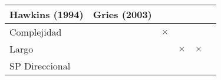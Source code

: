 \documentclass[12pt,spanish,a4paper,]{article}
\begin{document}
\begin{longtable}[]{@{}lccccc@{}}
\begin{minipage}[b]{0.13\columnwidth}
Hawkins (1994)\strut
\end{minipage} & \begin{minipage}[b]{0.13\columnwidth}\centering
Gries (2003)\strut
\end{minipage}\tabularnewline
\midrule
\endhead
\begin{minipage}[t]{0.18\columnwidth}\raggedright
Complejidad\strut
\end{minipage} & \begin{minipage}[t]{0.15\columnwidth}\centering
\strut
\end{minipage} & \begin{minipage}[t]{0.13\columnwidth}\centering
\(\times\)\strut
\end{minipage} & \begin{minipage}[t]{0.13\columnwidth}\centering
\strut
\end{minipage} & \begin{minipage}[t]{0.13\columnwidth}\centering
\strut
\end{minipage} & \begin{minipage}[t]{0.13\columnwidth}\centering
\strut
\end{minipage}\tabularnewline
\begin{minipage}[t]{0.18\columnwidth}\raggedright
Largo\strut
\end{minipage} & \begin{minipage}[t]{0.15\columnwidth}\centering
\strut
\end{minipage} & \begin{minipage}[t]{0.13\columnwidth}\centering
\strut
\end{minipage} & \begin{minipage}[t]{0.13\columnwidth}\centering
\(\times\)\strut
\end{minipage} & \begin{minipage}[t]{0.13\columnwidth}\centering
\(\times\)\strut
\end{minipage} & \begin{minipage}[t]{0.13\columnwidth}\centering
\strut
\end{minipage}\tabularnewline
\begin{minipage}[t]{0.18\columnwidth}\raggedright
SP Direccional\strut
\end{minipage} & \begin{minipage}[t]{0.15\columnwidth}\centering
\strut
\end{minipage} & \begin{minipage}[t]{0.13\columnwidth}\centering
\strut
\end{minipage} & \begin{minipage}[t]{0.13\columnwidth}\centering

\end{minipage}
\end{longtable}
\end{document}
